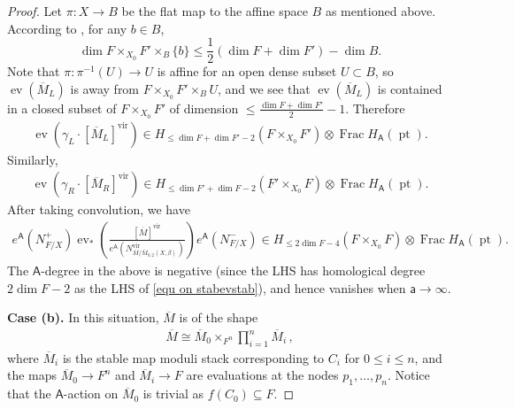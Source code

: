 \documentclass[10pt]{amsart}
\theoremstyle{definition}
\numberwithin{equation}{section}
\newcommand{\bZ}{\mathbb{Z}}
\newcommand{\vir}{\mathrm{vir}}
\newcommand{\sA}{\mathsf{A}}
\newcommand{\ev}{\operatorname{ev}}
\newcommand{\Frac}{\operatorname{Frac}}
\newcommand{\pt}{\operatorname{pt}}
\begin{document}
\begin{proof}
Let $\pi\colon X\to B$ be the flat map to the affine space $B$ as mentioned above. According to \cite[Lem.~3.22]{COZZ3}, for any $b\in B$,
$$\dim F\times_{X_0} F'\times_{B}\{b\}\leqslant \frac{1}{2}\left(\dim F+\dim F'\right)-\dim B.$$ 
Note that $\pi\colon \pi^{-1}(U)\to U$ is affine for an open dense subset $U\subset B$, so $\ev(\overline M_L)$ is away from $F\times_{X_0} F'\times_{B}U$, and we see that $\ev(\overline M_L)$ is contained in a closed subset of $F\times_{X_0} F'$ of dimension $\leqslant \frac{\dim F+\dim F'}{2}-1$. Therefore
\begin{align*}
\ev(\gamma_L\cdot[\overline M_L]^\vir)\in H_{\leqslant \dim F+\dim F'-2}(F\times_{X_0} F')\otimes \Frac H_\sA(\pt).
\end{align*}
Similarly,
\begin{align*}
\ev(\gamma_R\cdot[\overline M_R]^\vir)\in H_{\leqslant \dim F'+\dim F-2}(F'\times_{X_0} F)\otimes \Frac H_\sA(\pt).
\end{align*}
After taking convolution, we have
\begin{align*}
e^{\sA}\left(N_{F/X}^+\right)\ev_*\left(\frac{[\overline{M}]^{\vir}}{e^{\sA}\left(N^{\vir}_{\overline{M}/\overline{M}_{0,2}(X,\beta)}\right)} \right)e^{\sA}\left(N_{F/X}^-\right)\in H_{\leqslant 2\dim F-4}(F\times_{X_0} F)\otimes \Frac H_\sA(\pt).
\end{align*}
The $\sA$-degree in the above is negative (since the LHS has homological degree $2\dim F-2$ as the LHS of \eqref{equ on stabevstab}), and hence 
vanishes when $\mathsf a\to \infty$.

\bigskip

\textbf{Case (b).} 
In this situation, $\overline{M}$ is of the shape
\begin{align*}
    \overline{M}\cong \overline{M}_0\times_{F^n} \prod_{i=1}^n \overline{M}_i\,,
\end{align*}
where $\overline{M}_i$ is the stable map moduli stack corresponding to $C_i$ for $0\leqslant i\leqslant n$, and the maps $\overline{M}_0\to F^n$ and $\overline{M}_i\to F$ are evaluations at the nodes $p_1,\ldots,p_n$. 
Notice that the $\sA$-action on $\overline{M}_0$ is trivial as $f(C_0)\subseteq F$. 


\end{proof}
\end{document}
